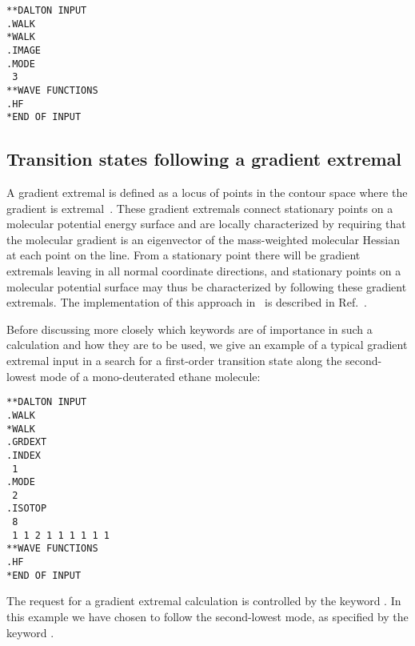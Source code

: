\begin{verbatim}
**DALTON INPUT
.WALK
*WALK
.IMAGE
.MODE
 3
**WAVE FUNCTIONS
.HF
*END OF INPUT
\end{verbatim}

\subsection{Transition states following a gradient
extremal}\label{sec:gradext}

\begin{center}
\end{center}

A gradient extremal is defined as a locus of points in the contour 
space where the gradient is extremal~\cite{pjhjajthtca73}. These
gradient extremals connect 
stationary points on a molecular potential energy surface and are
locally characterized by requiring that the molecular gradient is an
eigenvector of the mass-weighted molecular Hessian at each point on
the line. From a stationary point there will be gradient extremals
leaving in all normal coordinate directions, and stationary points
on a molecular potential surface may thus be characterized by
following these gradient extremals. The implementation of this approach
in \siraba\ is described in Ref.~\cite{pjhjajthtca73}.

Before discussing more closely which keywords are of importance in
such a calculation and how they are to be used, we give an example of
a typical gradient extremal input in a search for a first-order
transition state along the second-lowest mode of a mono-deuterated
ethane molecule:

\begin{verbatim}
**DALTON INPUT
.WALK
*WALK
.GRDEXT
.INDEX
 1
.MODE
 2
.ISOTOP
 8
 1 1 2 1 1 1 1 1 1
**WAVE FUNCTIONS
.HF
*END OF INPUT
\end{verbatim}


The request for a gradient extremal
calculation is controlled by the 
keyword . In this example we have chosen to follow the
second-lowest mode, as specified by the keyword .

